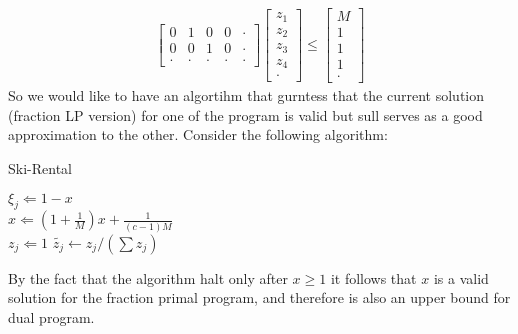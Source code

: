 \documentclass{article}
\begin{document}
\begin{multicols*}{2}
\begin{equation*}
\begin{split}
\begin{bmatrix}
	0 & 1 & 0 & 0 & \cdot \\
	0 & 0 & 1 & 0 & \cdot \\
	\cdot & \cdot & \cdot & \cdot & \cdot
      \end{bmatrix} 
      \begin{bmatrix}
	z_{1} \\
	z_{2} \\ 
	z_{3} \\
	z_{4} \\
	\cdot 
      \end{bmatrix} \le
      \begin{bmatrix}
	M \\
	1 \\ 
	1 \\
	1 \\
	\cdot 
      \end{bmatrix}
    \end{split}
  \end{equation*}
  So we would like to have an algortihm that gurntess that the current solution (fraction LP version) for one of the program is valid but sull serves as a good approximation to the other. Consider the following algorithm:  

  \begin{algorithm}[H]
    \caption{Ski-Rental}
    \label{alg:three}
     {
       { 
	$ \xi_{j} \Leftarrow 1 - x$ \\
	$ x \Leftarrow \left( 1 + \frac{1}{M} \right) x + \frac{1}{\left( c - 1  \right) M } $ \\
	$ z_{j} \Leftarrow 1$
      }
  }
  $\tilde{z_{j}} \leftarrow z_{j} / \left( \sum{z_{j}} \right)  $ 
  \end{algorithm}


By the fact that the algorithm halt only after $x \ge 1 $ it follows that $x$ is a valid solution for the fraction primal program, and therefore is also an upper bound for dual program. 


\end{multicols*}
\end{document}
